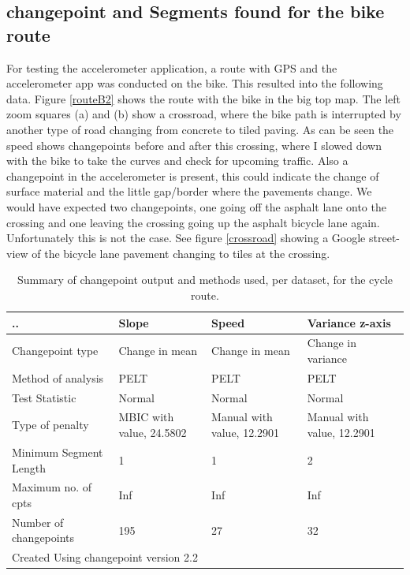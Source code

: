 \clearpage

\subsection{changepoint and Segments found for the bike route}
For testing the accelerometer application, a route with GPS and the accelerometer app was conducted on the bike. This resulted into the following data. Figure \ref{routeB2} shows the route with the bike in the big top map. The left zoom squares (a) and (b) show a crossroad, where the bike path is interrupted by another type of road changing from concrete to tiled paving. As can be seen the speed shows changepoints before and after this crossing, where I slowed down with the bike to take the curves and check for upcoming traffic. Also a changepoint in the accelerometer is present, this could indicate the change of surface material and the little gap/border where the pavements change. We would have expected two changepoints, one going off the asphalt lane onto the crossing and one leaving the crossing going up the asphalt bicycle lane again. Unfortunately this is not the case. See figure \ref{crossroad} showing a Google street-view of the bicycle lane pavement changing to tiles at the crossing.

\begin{table}[!hb]
\centering
\caption{Summary of changepoint output and methods used, per dataset, for the cycle route.}
\label{sss}
\begin{tabular}{|p{109pt}|p{85pt}|p{85pt}|p{85pt}|}
	\hline
	.. & Slope & Speed & Variance z-axis \\
	\hline 
	Changepoint type 	& Change in mean 	& Change in mean 	& Change in variance \\
	Method of analysis	& PELT 				& PELT 				& PELT\\
	Test Statistic 		& Normal 			& Normal 			& Normal\\
	Type of penalty		& MBIC with value, 24.5802 & Manual with value, 12.2901 & Manual with value, 12.2901\\
	Minimum Segment Length	& 1 			& 1 				& 2 \\
	Maximum no. of cpts 	& Inf 			& Inf 			& Inf \\
	Number of changepoints 	& 195			& 27 				& 32 \\
	\hline
	\multicolumn{4}{|l|}{Created Using changepoint version 2.2 } \\
	\hline
\end{tabular}
\end{table}

